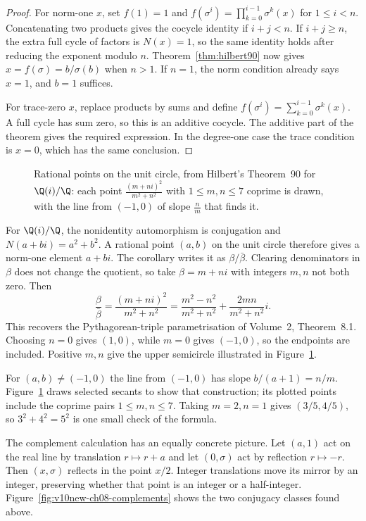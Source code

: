 \begin{proof}
For norm-one $x$, set $f(1)=1$ and
$f(\sigma^i)=\prod_{k=0}^{i-1}\sigma^k(x)$ for $1\le i<n$.
Concatenating two products gives the cocycle identity if $i+j<n$. If $i+j\ge n$, the extra full cycle of factors is $N(x)=1$, so the same identity holds after reducing the exponent modulo $n$. Theorem~\ref{thm:hilbert90} now gives $x=f(\sigma)=b/\sigma(b)$ when $n>1$. If $n=1$, the norm condition already says $x=1$, and $b=1$ suffices.

For trace-zero $x$, replace products by sums and define
$f(\sigma^i)=\sum_{k=0}^{i-1}\sigma^k(x)$. A full cycle has sum zero, so this is an additive cocycle. The additive part of the theorem gives the required expression. In the degree-one case the trace condition is $x=0$, which has the same conclusion.
\end{proof}

\begin{figure}[ht]
\centering
{}
\caption{Rational points on the unit circle, from Hilbert's Theorem~90 for $\Q(i)/\Q$: each point $\frac{(m+ni)^2}{m^2+n^2}$ with $1\le m,n\le7$ coprime is drawn, with the line from $(-1,0)$ of slope $\frac nm$ that finds it.}
\label{fig:rationalcircle}
\end{figure}

\begin{example}\label{ex:pythagoras}
For $\Q(i)/\Q$, the nonidentity automorphism is conjugation and
$N(a+bi)=a^2+b^2$. A rational point $(a,b)$ on the unit circle therefore gives a norm-one element $a+bi$. The corollary writes it as $\beta/\bar\beta$. Clearing denominators in $\beta$ does not change the quotient, so take $\beta=m+ni$ with integers $m,n$ not both zero. Then
\[
\frac{\beta}{\bar\beta}
=\frac{(m+ni)^2}{m^2+n^2}
=\frac{m^2-n^2}{m^2+n^2}
 +\frac{2mn}{m^2+n^2}i.
\]
This recovers the Pythagorean-triple parametrisation of Volume~2, Theorem~8.1. Choosing $n=0$ gives $(1,0)$, while $m=0$ gives $(-1,0)$, so the endpoints are included. Positive $m,n$ give the upper semicircle illustrated in Figure~\ref{fig:rationalcircle}.
\end{example}

For $(a,b)\ne(-1,0)$ the line from $(-1,0)$ has slope
$b/(a+1)=n/m$. Figure~\ref{fig:rationalcircle} draws selected secants to show that construction; its plotted points include the coprime pairs $1\le m,n\le7$. Taking $m=2,n=1$ gives $(3/5,4/5)$, so $3^2+4^2=5^2$ is one small check of the formula.

The complement calculation has an equally concrete picture. Let $(a,1)$ act on the real line by translation $r\mapsto r+a$ and let $(0,\sigma)$ act by reflection $r\mapsto-r$. Then $(x,\sigma)$ reflects in the point $x/2$. Integer translations move its mirror by an integer, preserving whether that point is an integer or a half-integer. Figure~\ref{fig:v10new-ch08-complements} shows the two conjugacy classes found above.

